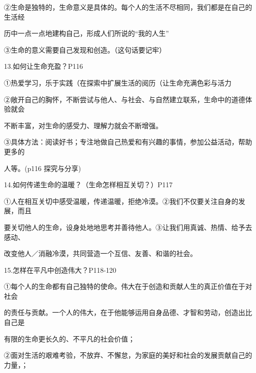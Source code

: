 \documentclass[lang=cn,11pt]{elegantbook}
\newcommand{\daofasym}[1]{{\daofasymbolfont #1}}
\newcommand{\daofasym}[1]{#1}
\begin{document}
\daofasym{②}生命是独特的，生命意义是具体的。每个人的生活不尽相同，我们都是在自己的生活经\par

历中一点一点地建构自己，形成人们所说的“我的人生”\par

\daofasym{③}生命的意义需要自己发现和创造。（这句话要记牢）\par

13.如何让生命充盈？P116\par

\daofasym{①}热爱学习，乐于实践（在探索中扩展生活的阅历（让生命充满色彩与活力\par

\daofasym{②}敞开自己的胸怀，不断尝试与他人、与社会、与自然建立联系，生命中的道德体验就会\par

不断丰富，对生命的感受力、理解力就会不断增强。\par

\daofasym{③}具体方法：阅读好书；专注地做自己热爱和有兴趣的事情，参加公益活动，帮助更多的\par

人等。(p116 探究与分享)\par

14.如何传递生命的温暖？（生命怎样相互关切？）P117\par

\daofasym{①}人在相互关切中感受温暖，传递温暖，拒绝冷漠。\daofasym{②}我们不仅要关注自身的发展，而且\par

要关切他人的生命，设身处地地思考并善待他人。\daofasym{③}让我们用真诚、热情、给予去感动、\par

改变他人／消融冷漠，共同营造一个互信、友善、和谐的社会。\par

15.怎样在平凡中创造伟大？P118-120\par

\daofasym{①}每个人的生命都有自己独特的使命。伟大在于创造和贡献人生的真正价值在于对社会\par

的责任与贡献。一个人的伟大，在于他能够运用自身品德、才智和劳动，创造出比自己是\par

有限的生命更长久的、不平凡的社会价值；\par

\daofasym{②}面对生活的艰难考验，不放弃、不懈怠，为家庭的美好和社会的发展贡献自己的力量，；\par
\end{document}
